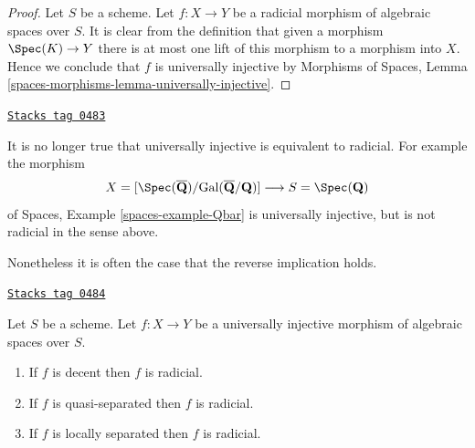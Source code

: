 \begin{proof}
Let $S$ be a scheme. Let $f : X \to Y$ be a radicial
morphism of algebraic spaces over $S$.
It is clear from the definition that given a morphism
$\Spec(K) \to Y$ there is at most one lift of this morphism
to a morphism into $X$. Hence we conclude that $f$ is universally
injective by
Morphisms of Spaces,
Lemma \ref{spaces-morphisms-lemma-universally-injective}.
\end{proof}

\begin{example}
\label{spaces-more-morphisms-example-universally-injective-not-radicial}
\href{https://stacks.math.columbia.edu/tag/0483}{\texttt{Stacks tag 0483}}

It is no longer true that universally injective is equivalent to radicial.
For example the morphism
$$
X = [\Spec(\overline{\mathbf{Q}})/
\text{Gal}(\overline{\mathbf{Q}}/\mathbf{Q})]
\longrightarrow
S = \Spec(\mathbf{Q})
$$
of
Spaces, Example \ref{spaces-example-Qbar}
is universally injective, but is not radicial in the sense above.
\end{example}

Nonetheless it is often the case that the reverse implication holds.

\begin{lemma}
\label{spaces-more-morphisms-lemma-when-universally-injective-radicial}
\href{https://stacks.math.columbia.edu/tag/0484}{\texttt{Stacks tag 0484}}

Let $S$ be a scheme. Let $f : X \to Y$ be a universally injective
morphism of algebraic spaces over $S$.
\begin{enumerate}
\item If $f$ is decent then $f$ is radicial.
\item If $f$ is quasi-separated then $f$ is radicial.
\item If $f$ is locally separated then $f$ is radicial.
\end{enumerate}
\end{lemma}

